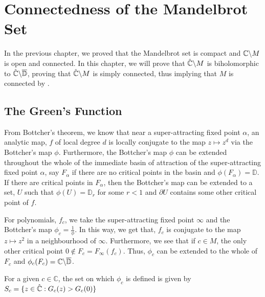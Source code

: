 \chapter{Connectedness of the Mandelbrot Set}
In the previous chapter, we proved that the Mandelbrot set is compact and \( \mathbb{C}\backslash M \)
is open and connected. In this chapter, we will prove that \( \hat{\mathbb{C}}\backslash M \) is biholomorphic
to \( \hat{\mathbb{C}}\backslash \overline{\mathbb{D}}  \), proving that \( \hat{\mathbb{C}}\backslash M \) is simply connected, thus implying that \( M \) is connected by .

\section{The Green's Function}
From Bottcher's theorem, we know that near a super-attracting fixed point \( \alpha \), an analytic map, \( f \) of local degree \( d \) is locally conjugate to the map \( z\mapsto z^d \)
via the Bottcher's map \( \phi \). Furthermore, the Bottcher's map \( \phi \)
can be extended throughout the whole of the immediate basin of attraction of the super-attracting fixed point \( \alpha \), say \( F_\alpha \) if there are no critical points in the basin and \( \phi(F_\alpha)=\mathbb{D} \). If there are critical points in \( F_\alpha \), then the Bottcher's map can be extended to a set, \( U \) such that \( \phi(U)=\mathbb{D}_r \) for some \( r<1 \) and \( \partial U \) contains some other critical point of \( f \).

For polynomials, \( f_c \), we take the super-attracting fixed point \( \infty \) and the Bottcher's map \( \phi_c=\frac{1}{\phi} \). In this way, we get that, \( f_c \) is conjugate to the map \( z\mapsto z^2 \) in a neighbourhood of \( \infty \). Furthermore, we see that if \( c\in M \), the only other critical point \( 0\not\in F_c=F_\infty(f_c)\). Thus, \( \phi_c \) can be extended to the whole of \( F_c \) and \( \phi_c(F_c)=\mathbb{C}\backslash \overline{\mathbb{D}}  \).


\begin{theorem}
	For a given \( c\in \mathbb{C} \), the set on which \( \phi_c \) is defined is given by \( S_c=\{z\in \hat{\mathbb{C}}:G_c(z)>G_c(0)\} \)
\end{theorem}

